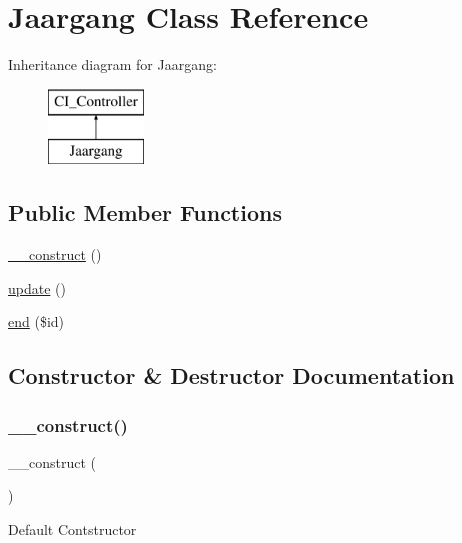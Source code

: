 \hypertarget{class_jaargang}{}\section{Jaargang Class Reference}
\label{class_jaargang}
Inheritance diagram for Jaargang\+:\begin{figure}[H]
\begin{center}
\leavevmode
\includegraphics[height=2.000000cm]{class_jaargang}
\end{center}
\end{figure}
\subsection*{Public Member Functions}
\begin{DoxyCompactItemize}
\item 
\mbox{\hyperlink{class_jaargang_a095c5d389db211932136b53f25f39685}{\+\_\+\+\_\+construct}} ()
\item 
\mbox{\hyperlink{class_jaargang_a842e4774e3b3601a005b995c02f7e883}{update}} ()
\item 
\mbox{\hyperlink{class_jaargang_a96b12cad9ede16ef3e87c74cf77b894b}{end}} (\$id)
\end{DoxyCompactItemize}


\subsection{Constructor \& Destructor Documentation}
\mbox{\label{class_jaargang_a095c5d389db211932136b53f25f39685}} 
\subsubsection{\texorpdfstring{\+\_\+\+\_\+construct()}{\_\_construct()}}
{\footnotesize\ttfamily \+\_\+\+\_\+construct (\begin{DoxyParamCaption}{ }\end{DoxyParamCaption})}

Default Contstructor 

